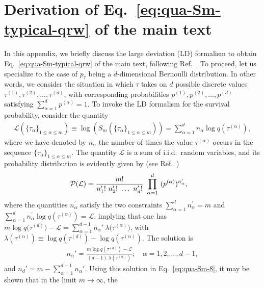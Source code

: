 \documentclass[12pt]{iopart}
\begin{document}
\section{Derivation of Eq.~\eqref{eq:qua-Sm-typical-qrw} of the main text}
\label{sec:qua-app1}
In this appendix, we briefly discuss the large deviation (LD) formalism
to obtain Eq.~\eqref{eq:qua-Sm-typical-qrw} of the main text, following Ref.~\cite{Gherardini:2016}. To proceed, let us specialize to the case of $p_\tau$
being a $d$-dimensional Bernoulli distribution. In other words, we
consider the situation in which $\tau$ takes on $d$ possible discrete
values $\tau^{(1)},\tau^{(2)},\ldots,\tau^{(d)}$, with corresponding
probabilities $p^{(1)},p^{(2)},\ldots,p^{(d)}$ satisfying
$\sum_{\alpha=1}^d p^{(\alpha)}=1$. To invoke the LD formalism for the survival probability, consider the
quantity
\begin{align}
        \mathcal{L}(\{\tau_\alpha\}_{1\le \alpha \le m})\equiv\log
        \left(S_m(\{\tau_\alpha\}_{1\le \alpha \le
        m})\right) =\sum_{\alpha=1}^{d}n_{\alpha}\log
        q(\tau^{(\alpha)}),
        \label{eq:qua-Sm-7}
\end{align}
where we have denoted by $n_{\alpha}$ the number of times the value
$\tau^{(\alpha)}$ occurs in the sequence $\{\tau_\alpha\}_{1\le \alpha \le m}$.
The quantity $\mathcal{L}$ is a sum of
i.i.d.~random variables, and its probability distribution is evidently
given by (see Ref.~\cite{Gherardini:2016})
\begin{align}
{\cal P}(\mathcal{L})&=\frac{m!}{n^\prime_{1}!~n^\prime_{2}!~\ldots~
n^\prime_{d}!} ~\prod_{\alpha=1}^{d}
        ~(p^{(\alpha)})^{n^\prime_\alpha},
        \label{eq:qua-Sm-8}
\end{align}
where the quantities
$n^\prime_\alpha$ satisfy the two constraints $\sum\limits_{\alpha=1}^d n^\prime_{\alpha}=m$ and
$\sum\limits_{\alpha=1}^{d}n^\prime_{\alpha}\log
q(\tau^{(\alpha)})=\mathcal{L}$, implying that one has $m \log
q\big(\tau^{(d)}\big)-\mathcal{L}=\sum\limits_{\alpha=1}^{d-1}n_{\alpha}'
~\lambda\big(\tau^{(\alpha)}\big)$, with
$\lambda(\tau^{(\alpha)})\equiv\log q(\tau^{(d)})- \log
q(\tau^{(\alpha)})$. The solution is~\cite{Gherardini:2016}
\begin{align}\label{qua-sol1}
n_{\alpha}'=\frac{m\log q\left(\tau^{(d)}\right)-\mathcal{L}}
{(d-1)~\lambda\left(\tau^{(\alpha)}\right)}; \quad \alpha=1,2,\ldots,d-1,
\end{align}
and $n_d'=m-\sum_{\alpha=1}^{d-1}n_{\alpha}'$. Using this solution in
Eq.~\eqref{eq:qua-Sm-8}, it may be shown that in the limit $m \to \infty$, the
\end{document}
